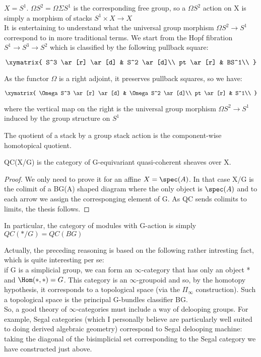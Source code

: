 \begin{eg}
$X=S^1$. $\Omega S^2 =\Omega\Sigma S^1$ is the corresponding free group, so a $\Omega S^2$ action on X is simply a morphism of stacks $S^1\times X\to X$\\
It is entertaining to understand what the universal group morphism $\Omega S^2\to S^1$ correspond to in more traditional terms. We start from the Hopf fibration $S^1\to S^3\to S^2$
which is classified by the following pullback square:

\begin{displaymath}
\xymatrix{
S^3 \ar[r] \ar[d] &  S^2 \ar[d]\\
 pt \ar[r] & BS^1\\
}
\end{displaymath}

As the functor $\Omega$ is a right adjoint, it preserves pullback squares, so we have:

\begin{displaymath}
\xymatrix{
\Omega S^3 \ar[r] \ar[d] &  \Omega S^2 \ar[d]\\
 pt \ar[r] & S^1\\
}
\end{displaymath}

where the vertical map on the right is the universal group morphism $\Omega S^2\to S^1$ induced by the group structure on $S^1$
\end{eg}

The quotient of a stack by a group stack action is the component-wise homotopical quotient.

\begin{prop}
QC(X/G) is the category of G-equivariant quasi-coherent sheaves over X.
\end{prop}
 
\begin{proof}
We only need to prove it for an affine $X=\spec(A)$. In that case X/G is the colimit of a BG(A) shaped diagram where the only object is $\spec(A)$ and to each arrow we assign
the corresponging element of G. As QC sends colimits to limits, the thesis follows.
\end{proof}

In particular, the category of modules with G-action is simply $QC(*/G)=QC(BG)$

\begin{rmk}
Actually, the preceding reasoning is based on the following rather intresting fact, which is quite interesting per se:\\
if G is a simplicial group, we can form an $\infty$-category that has only an object * and $\Hom(*,*)=G$. This category is an $\infty$-groupoid and so, by the homotopy
hypothesis, it corresponds to a topological space (via the $\Pi_{\infty}$ construction). Such a topological space is the principal G-bundles classifier BG.\\
So, a good theory of $\infty$-categories must include a way of delooping groups. For example, Segal categories (which I personally believe are particularly well suited to
doing derived algebraic geometry) correspond to Segal delooping machine: taking the diagonal of the bisimplicial set corresponding to the Segal category we have constructed
just above.
\end{rmk}

\printbibliography[heading = local, category = higherstacks]
